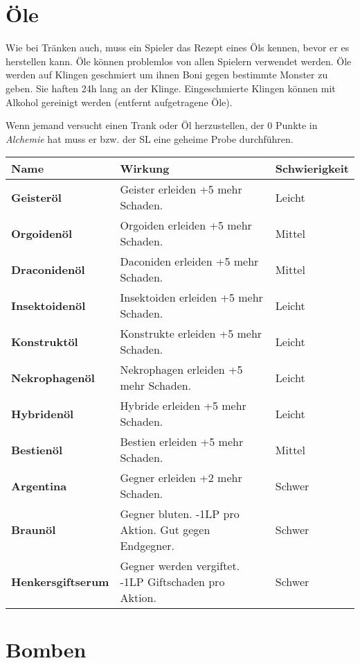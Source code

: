 \section{Öle}
Wie bei Tränken auch, muss ein Spieler das Rezept eines Öls kennen, bevor er es herstellen kann. Öle können problemlos von allen Spielern verwendet werden. Öle werden auf Klingen geschmiert um ihnen Boni gegen bestimmte Monster zu geben. Sie haften 24h lang an der Klinge. Eingeschmierte Klingen können mit Alkohol gereinigt werden (entfernt aufgetragene Öle).

Wenn jemand versucht einen Trank oder Öl herzustellen, der 0 Punkte in \textit{Alchemie} hat muss er bzw. der SL eine geheime Probe durchführen.

\begin{tabular}{|p{4cm}|p{8.5cm}|p{3cm}|}
\hline
\textbf{Name} & \textbf{Wirkung} & \textbf{Schwierigkeit} \\

\hline
\textbf{Geisteröl} & Geister erleiden +5 mehr Schaden. & Leicht \\

\hline
\textbf{Orgoidenöl} & Orgoiden erleiden +5 mehr Schaden. & Mittel \\

\hline
\textbf{Draconidenöl} & Daconiden erleiden +5 mehr Schaden. & Mittel \\

\hline
\textbf{Insektoidenöl} & Insektoiden erleiden +5 mehr Schaden. & Leicht \\

\hline
\textbf{Konstruktöl} & Konstrukte erleiden +5 mehr Schaden. & Leicht \\

\hline
\textbf{Nekrophagenöl} & Nekrophagen erleiden +5 mehr Schaden. & Leicht \\

\hline
\textbf{Hybridenöl} & Hybride erleiden +5 mehr Schaden. & Leicht \\

\hline
\textbf{Bestienöl} & Bestien erleiden +5 mehr Schaden. & Mittel \\

\hline
\textbf{Argentina} & Gegner erleiden +2 mehr Schaden. & Schwer \\

\hline
\textbf{Braunöl} & Gegner bluten. -1LP pro Aktion. Gut gegen Endgegner. & Schwer \\

\hline
\textbf{Henkersgiftserum} & Gegner werden vergiftet. -1LP Giftschaden pro Aktion. & Schwer \\

\hline
\end{tabular}

\section{Bomben}